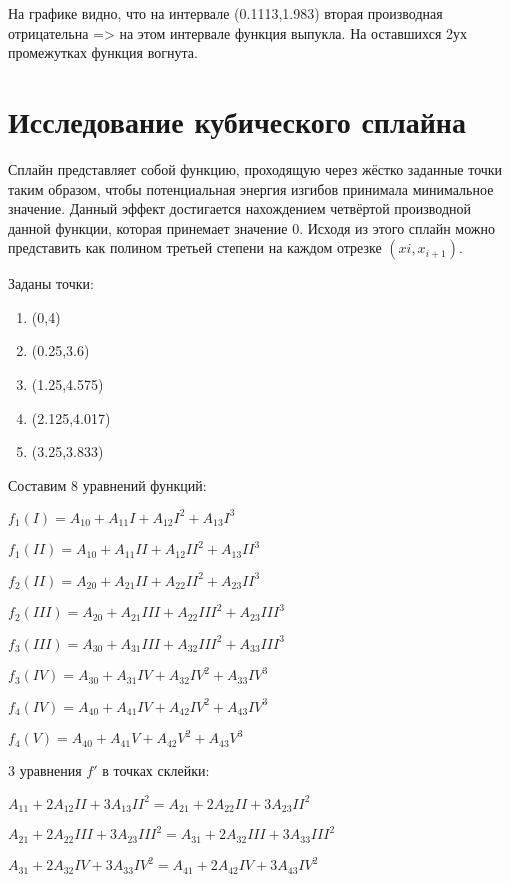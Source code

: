 \documentclass[russian,utf8,nocolumnxxxi,nocolumnxxxii]{eskdtext}
\begin{document}
\begin{enumerate}
На графике видно, что на интервале (0.1113,1.983) вторая производная отрицательна => на этом интервале функция выпукла. На оставшихся 2ух промежутках функция вогнута.

\end{enumerate}

\newpage
\section{Исследование кубического сплайна}

Сплайн представляет собой функцию, проходящую через жёстко заданные точки таким образом, чтобы потенциальная энергия изгибов принимала минимальное значение. Данный эффект достигается нахождением четвёртой производной данной функции, которая принемает значение 0. Исходя из этого сплайн можно представить как полином третьей степени на каждом отрезке $(xi,x_{i+1})$.

Заданы точки:
\begin{enumerate}[I]
    \item (0,4)
    \item (0.25,3.6)
    \item (1.25,4.575)
    \item (2.125,4.017)
    \item (3.25,3.833)
\end{enumerate}

Составим 8 уравнений функций:
\begin{center}

$f_1(I)=A_{10}+A_{11}I+A_{12}I^2+A_{13}I^3$

$f_1(II)=A_{10}+A_{11}II+A_{12}II^2+A_{13}II^3$

$f_2(II)=A_{20}+A_{21}II+A_{22}II^2+A_{23}II^3$

$f_2(III)=A_{20}+A_{21}III+A_{22}III^2+A_{23}III^3$

$f_3(III)=A_{30}+A_{31}III+A_{32}III^2+A_{33}III^3$

$f_3(IV)=A_{30}+A_{31}IV+A_{32}IV^2+A_{33}IV^3$

$f_4(IV)=A_{40}+A_{41}IV+A_{42}IV^2+A_{43}IV^3$

$f_4(V)=A_{40}+A_{41}V+A_{42}V^2+A_{43}V^3$

\end{center}

3 уравнения $f'$ в точках склейки:

\begin{center}
    
$A_{11}+2A_{12}II+3A_{13}II^2=A_{21}+2A_{22}II+3A_{23}II^2$

$A_{21}+2A_{22}III+3A_{23}III^2=A_{31}+2A_{32}III+3A_{33}III^2$

$A_{31}+2A_{32}IV+3A_{33}IV^2=A_{41}+2A_{42}IV+3A_{43}IV^2$
    
\end{center}
\end{document}
